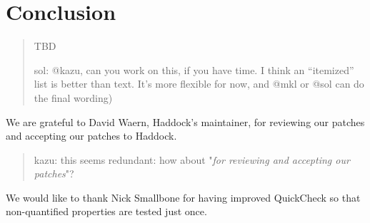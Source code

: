 \documentclass[preprint]{sigplanconf}
\begin{document}
\section{Conclusion}

\begin{quote}
    TBD

    sol: @kazu, can you work on this, if you have time.  I think an
    ``itemized'' list is better than text.  It's more flexible for
    now, and @mkl or @sol can do the final wording)
\end{quote}



\acks

We are grateful to David Waern, Haddock's maintainer, for reviewing our patches
and accepting our patches to Haddock.

\begin{quote}
  kazu: this seems redundant: how about "\emph{for reviewing and accepting our patches}"?
\end{quote}

We would like to thank
Nick Smallbone for having improved QuickCheck so that
non-quantified properties are tested just once.




\end{document}
